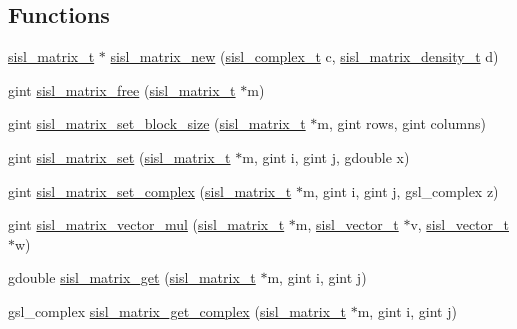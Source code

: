 \subsection*{Functions}
\begin{DoxyCompactItemize}
\item 
\hyperlink{group__matrix_gad147923587b355644defb9bfbf981740}{sisl\+\_\+matrix\+\_\+t} $\ast$ \hyperlink{group__matrix_ga29ab0c52a1e38fc785031c5e93e4ca98}{sisl\+\_\+matrix\+\_\+new} (\hyperlink{group__vector_gadbf341f8965fc86dda28912ab5f04930}{sisl\+\_\+complex\+\_\+t} c, \hyperlink{group__matrix_gae50d4f05ed96de495bdd326c201c28ff}{sisl\+\_\+matrix\+\_\+density\+\_\+t} d)
\item 
gint \hyperlink{group__matrix_ga35de2cf4acfbe6e820f895a2ace8b328}{sisl\+\_\+matrix\+\_\+free} (\hyperlink{group__matrix_gad147923587b355644defb9bfbf981740}{sisl\+\_\+matrix\+\_\+t} $\ast$m)
\item 
gint \hyperlink{group__matrix_ga4dbf57c7f1ff8a417425b978b85ceefc}{sisl\+\_\+matrix\+\_\+set\+\_\+block\+\_\+size} (\hyperlink{group__matrix_gad147923587b355644defb9bfbf981740}{sisl\+\_\+matrix\+\_\+t} $\ast$m, gint rows, gint columns)
\item 
gint \hyperlink{group__matrix_ga67a577100e392546e9b3833415c739fd}{sisl\+\_\+matrix\+\_\+set} (\hyperlink{group__matrix_gad147923587b355644defb9bfbf981740}{sisl\+\_\+matrix\+\_\+t} $\ast$m, gint i, gint j, gdouble x)
\item 
gint \hyperlink{group__matrix_ga13808fa06a8b9d648152ae25ef7996d7}{sisl\+\_\+matrix\+\_\+set\+\_\+complex} (\hyperlink{group__matrix_gad147923587b355644defb9bfbf981740}{sisl\+\_\+matrix\+\_\+t} $\ast$m, gint i, gint j, gsl\+\_\+complex z)
\item 
gint \hyperlink{group__matrix_ga56825a47cadc80aa00795feedeb002bc}{sisl\+\_\+matrix\+\_\+vector\+\_\+mul} (\hyperlink{group__matrix_gad147923587b355644defb9bfbf981740}{sisl\+\_\+matrix\+\_\+t} $\ast$m, \hyperlink{group__vector_gacbac585492f5005f05f0c0b8463039be}{sisl\+\_\+vector\+\_\+t} $\ast$v, \hyperlink{group__vector_gacbac585492f5005f05f0c0b8463039be}{sisl\+\_\+vector\+\_\+t} $\ast$w)
\item 
gdouble \hyperlink{group__matrix_ga441d1109b3297e94b7c4fba2b618ea0c}{sisl\+\_\+matrix\+\_\+get} (\hyperlink{group__matrix_gad147923587b355644defb9bfbf981740}{sisl\+\_\+matrix\+\_\+t} $\ast$m, gint i, gint j)
\item 
gsl\+\_\+complex \hyperlink{group__matrix_ga0a0ea595d8beec73a6673101ad348add}{sisl\+\_\+matrix\+\_\+get\+\_\+complex} (\hyperlink{group__matrix_gad147923587b355644defb9bfbf981740}{sisl\+\_\+matrix\+\_\+t} $\ast$m, gint i, gint j)

\end{DoxyCompactItemize}
